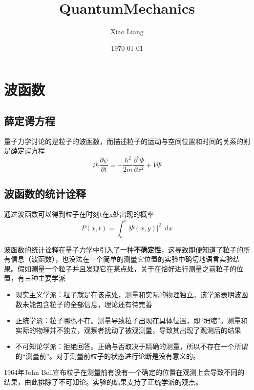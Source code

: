 \documentclass[UTF8]{ctexart}
\title{QuantumMechanics}
\author{Xiao Liang}
\date{\today}
\newcommand*{\dif}{\mathop{}\!\mathrm{d}}
\begin{document}
    \maketitle
    \tableofcontents

    \section{波函数}
    \subsection{薛定谔方程}
    量子力学讨论的是粒子的波函数，而描述粒子的运动与空间位置和时间的关系的则是薛定谔方程
    \begin{equation}
        i \hbar \frac{\partial \psi}{\partial t} = - \frac{\hbar^2}{2m} \frac{\partial ^2\Psi}{\partial x^2} + V \Psi \label{equ_Schrodinger}
    \end{equation}

    \subsection{波函数的统计诠释}
    通过波函数可以得到粒子在时刻t在x处出现的概率
    \begin{equation}
    P(x,t) = \int_{a}^{b} |\Psi(x,y)|^2 \dif x
    \end{equation}

    波函数的统计诠释在量子力学中引入了一种\textbf{不确定性}，这导致即便知道了粒子的所有信息（波函数），也没法在一个简单的测量它位置的实验中确切地语言实验结果。假如测量一个粒子并且发现它在某点处，关于在恰好进行测量之前粒子的位置，有三种主要学派
    \begin{itemize}
        \item 现实主义学派：粒子就是在该点处，测量和实际的物理独立。该学派表明波函数未能包含粒子的全部信息，理论还有待完善
        \item 正统学派：粒子哪也不在。测量导致粒子出现在具体位置，即“坍缩”。测量和实际的物理并不独立，观察者扰动了被观测量，导致其出现了观测后的结果
        \item 不可知论学派：拒绝回答。正确与否取决于精确的测量，所以不存在一个所谓的“测量前”。对于测量前粒子的状态进行论断是没有意义的。
    \end{itemize}

    1964年John Bell宣布粒子在测量前有没有一个确定的位置在观测上会导致不同的结果，由此排除了不可知论。实验的结果支持了正统学派的观点。
\end{document}
